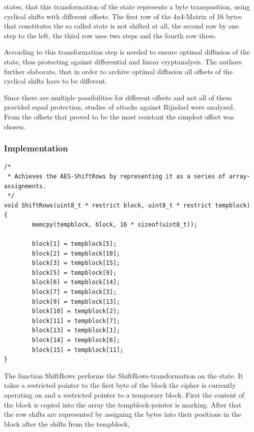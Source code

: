 \cite[p. 37]{rijndael} states, that this transformation of the state represents a byte transposition, using
cyclical shifts with different offsets. The first row of the 4x4-Matrix
of 16 bytes that constitutes the so called state is not shifted at all,
the second row by one step to the left, the third row uses two steps and
the fourth row three.

According to \cite{rijndael} this transformation step is needed to ensure
optimal diffusion of the state, thus protecting
against differential and linear cryptanalysis. The authors further
elaborate, that in order to archive optimal diffusion all
offsets of the cyclical shifts have to be different.

Since there are multiple possibilities for different offsets and not all
of them provided equal protection, studies of attacks against Rijndael
were analyzed. From the offsets that proved to be the most resistant the
simplest offset was chosen.

\hypertarget{implementation-3}{%
\subsubsection{Implementation}\label{implementation-3}}

\begin{lstlisting}
/*
 * Achieves the AES-ShiftRows by representing it as a series of array-assignments.
 */
void ShiftRows(uint8_t * restrict block, uint8_t * restrict tempblock)
{
        memcpy(tempblock, block, 16 * sizeof(uint8_t));

        block[1] = tempblock[5];
        block[2] = tempblock[10];
        block[3] = tempblock[15];
        block[5] = tempblock[9];
        block[6] = tempblock[14];
        block[7] = tempblock[3];
        block[9] = tempblock[13];
        block[10] = tempblock[2];
        block[11] = tempblock[7];
        block[13] = tempblock[1];
        block[14] = tempblock[6];
        block[15] = tempblock[11];
}
\end{lstlisting}

The function ShiftRows performs the ShiftRows-transformation on the
state. It takes a restricted pointer to the first byte of the block the
cipher is currently operating on and a restricted pointer to a temporary
block. First the content of the block is copied into the array the
tempblock-pointer is marking. After that the row shifts are represented
by assigning the bytes into their positions in the block after the
shifts from the tempblock,

